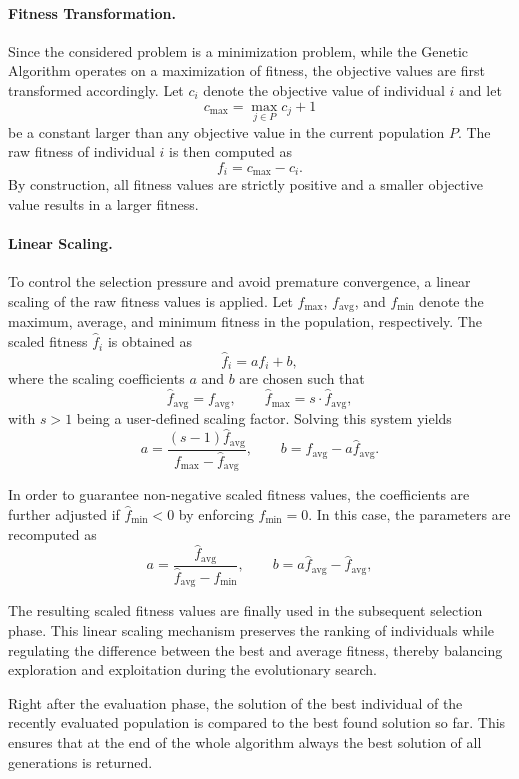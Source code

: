 \documentclass[12pt]{article}
\begin{document}
\paragraph{Fitness Transformation.}
Since the considered problem is a minimization problem, while the Genetic Algorithm operates on a maximization of fitness, the objective values are first transformed accordingly. Let $c_i$ denote the objective value of individual $i$ and let
\[
c_{\max} = \max_{j \in P} c_j + 1
\]
be a constant larger than any objective value in the current population $P$. The raw fitness of individual $i$ is then computed as
\[
f_i = c_{\max} - c_i .
\]
By construction, all fitness values are strictly positive and a smaller objective value results in a larger fitness.

\paragraph{Linear Scaling.}
To control the selection pressure and avoid premature convergence, a linear scaling of the raw fitness values is applied. Let $f_{\max}$, $f_{\text{avg}}$, and $f_{\min}$ denote the maximum, average, and minimum fitness in the population, respectively. The scaled fitness $\hat{f}_i$ is obtained as
\[
\hat{f}_i = a f_i + b ,
\]
where the scaling coefficients $a$ and $b$ are chosen such that
\[
\hat{f}_{\text{avg}} = f_{\text{avg}}, \qquad
\hat{f}_{\max} = s \cdot \hat{f}_{\text{avg}},
\]
with $s > 1$ being a user-defined scaling factor. Solving this system yields
\[
a = \frac{(s-1) \hat{f}_{\text{avg}}}{f_{\max} - \hat{f}_{\text{avg}}}, \qquad
b = f_{\text{avg}} - a \hat{f}_{\text{avg}} .
\]

In order to guarantee non-negative scaled fitness values, the coefficients are further adjusted if $\hat{f}_{\min} < 0$ by enforcing $\hat{f}_{\min} = 0$. 
In this case, the parameters are recomputed as
\[
a = \frac{\hat{f}_{\text{avg}}}{\hat{f}_{\text{avg}} - f_{\min}}, 
\qquad
b = a \hat{f}_{\text{avg}} - \hat{f}_{\text{avg}},
\]

The resulting scaled fitness values are finally used in the subsequent selection phase.
This linear scaling mechanism preserves the ranking of individuals while regulating the difference between the best and average fitness, thereby balancing exploration and exploitation during the evolutionary search.

\bigskip

Right after the evaluation phase, the solution of the best individual of the recently evaluated population is compared to the best found solution so far. This ensures that at the end of the whole algorithm always the best solution of all generations is returned.
\end{document}
